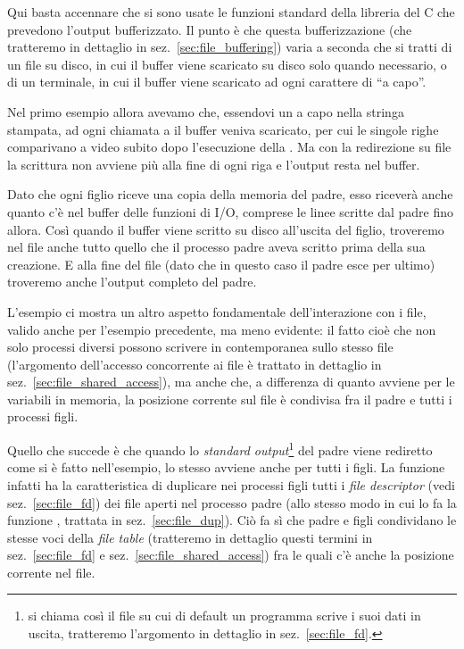 Qui basta accennare che si sono usate le funzioni standard della libreria del
C che prevedono l'output bufferizzato. Il punto è che questa bufferizzazione
(che tratteremo in dettaglio in sez.~\ref{sec:file_buffering}) varia a seconda
che si tratti di un file su disco, in cui il buffer viene scaricato su disco
solo quando necessario, o di un terminale, in cui il buffer viene scaricato ad
ogni carattere di ``a capo''.

Nel primo esempio allora avevamo che, essendovi un a capo nella stringa
stampata, ad ogni chiamata a  il buffer veniva scaricato, per cui
le singole righe comparivano a video subito dopo l'esecuzione della
. Ma con la redirezione su file la scrittura non avviene più alla
fine di ogni riga e l'output resta nel buffer. 

Dato che ogni figlio riceve una copia della memoria del padre, esso riceverà
anche quanto c'è nel buffer delle funzioni di I/O, comprese le linee scritte
dal padre fino allora. Così quando il buffer viene scritto su disco all'uscita
del figlio, troveremo nel file anche tutto quello che il processo padre aveva
scritto prima della sua creazione. E alla fine del file (dato che in questo
caso il padre esce per ultimo) troveremo anche l'output completo del padre.

L'esempio ci mostra un altro aspetto fondamentale dell'interazione con i file,
valido anche per l'esempio precedente, ma meno evidente: il fatto cioè che non
solo processi diversi possono scrivere in contemporanea sullo stesso file
(l'argomento dell'accesso concorrente ai file è trattato in dettaglio in
sez.~\ref{sec:file_shared_access}), ma anche che, a differenza di quanto
avviene per le variabili in memoria, la posizione corrente sul file è
condivisa fra il padre e tutti i processi figli.

Quello che succede è che quando lo \textit{standard output}\footnote{si chiama
  così il file su cui di default un programma scrive i suoi dati in uscita,
  tratteremo l'argomento in dettaglio in sez.~\ref{sec:file_fd}.} del padre
viene rediretto come si è fatto nell'esempio, lo stesso avviene anche per
tutti i figli. La funzione  infatti ha la caratteristica di
duplicare nei processi figli tutti i \textit{file descriptor} (vedi
sez.~\ref{sec:file_fd}) dei file aperti nel processo padre (allo stesso modo
in cui lo fa la funzione , trattata in sez.~\ref{sec:file_dup}). Ciò
fa sì che padre e figli condividano le stesse voci della \textit{file table}
(tratteremo in dettaglio questi termini in sez.~\ref{sec:file_fd} e
sez.~\ref{sec:file_shared_access}) fra le quali c'è anche la posizione
corrente nel file.

